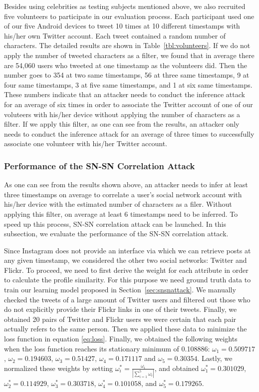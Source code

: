 \documentclass[letterpaper,12pt]{article}
\begin{document}
Besides using celebrities as testing subjects mentioned above, we also recruited five volunteers to participate in our evaluation process. Each participant used one of our five Android devices to tweet 10 times at 10 different timestamps with his/her own Twitter account. Each tweet contained a random number of characters. The detailed results are shown in Table~\ref{tbl:volunteers}. If we do not apply the number of tweeted characters as a filter, we found that in average there are 54,060 users who tweeted at one timestamp as the volunteers did. Then the number goes to 354 at two same timestamps, 56 at three same timestamps, 9 at four same timestamps, 3 at five same timestamps, and 1 at six same timestamps. These numbers indicate that an attacker needs to conduct the inference attack for an average of six times in order to associate the Twitter account of one of our voluteers with his/her device without applying the number of characters as a filter. If we apply this filter, as one can see from the results, an attacker only needs to conduct the inference attack for an average of three times to successfully associate one volunteer with his/her Twitter account. 

\subsubsection{Performance of the SN-SN Correlation Attack}
As one can see from the results shown above, an attacker needs to infer at least three timestamps on average to correlate a user's social network account with his/her device with the estimated number of characters as a filer. Without applying this filter, on average at least 6 timestamps need to be inferred. To speed up this process, SN-SN correlation attack can be launched. In this subsection, we evaluate the performance of the SN-SN correlation attack.

Since Instagram does not provide an interface via which we can retrieve posts at any given timestamp, we considered the other two social networks: Twitter and Flickr. To proceed, we need to first derive the weight for each attribute in order to calculate the profile similarity. For this purpose we need ground truth data to train our learning model proposed in Section~\ref{sec:snsnattack}. We manually checked the tweets of a large amount of Twitter users and filtered out those who do not explicitly provide their Flickr links in one of their tweets. Finally, we obtained 20 pairs of Twitter and Flickr users we were certain that each pair actually refers to the same person. Then we applied these data to minimize the loss function in equation \eqref{eq:loss}. Finally, we obtained the following weights when the loss function reaches its stationary minimum of 0.108886: $\omega_{1}=0.509717$, $\omega_{2}=0.194603$, $\omega_{3}=0.51427$, $\omega_{4}=0.171117$ and $\omega_{5}=0.30354$. Lastly, we normalized these weights by setting $\omega_{i}^*=\frac{\omega_{i}}{|\sum_{i=1}^{5}\omega_i|}$, and obtained $\omega_{1}^*=0.301029$, $\omega_{2}^*=0.114929$, $\omega_{3}^*=0.303718$, $\omega_{4}^*=0.101058$, and $\omega_{5}^*=0.179265$.
\end{document}
